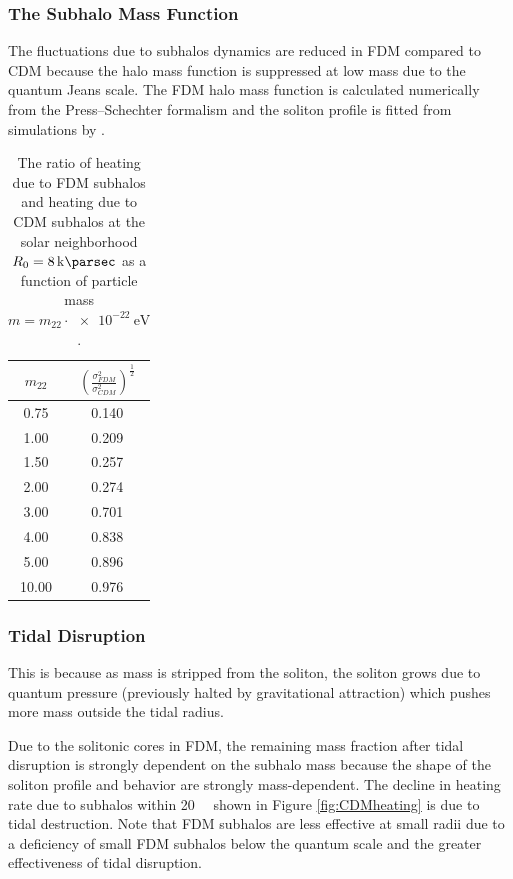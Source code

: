 \documentclass[usenatbib]{mnras}
\begin{document}
\subsubsection{The Subhalo Mass Function}

The fluctuations due to subhalos dynamics are reduced in FDM compared to CDM because the halo mass function is suppressed at low mass due to the quantum Jeans scale. The FDM halo mass function is calculated numerically from the Press--Schechter formalism \citep{substructure_FDM, marsh} and the soliton profile is fitted from simulations by \cite{schive_solitons}. 


\begin{table} 
\begin{center}
 \begin{tabular}{||c c||} 
 \hline
 $m_{22}$ & $\left( \frac{\sigma_{FDM}^2}{\sigma_{CDM}^2} \right)^{\tfrac{1}{2}}$ \\ [2.5ex] 
 \hline\hline
 0.75 & 0.140 \\ 
 \hline
 1.00 & 0.209 \\
 \hline
 1.50 & 0.257 \\
 \hline
 2.00 & 0.274 \\
 \hline
 3.00 & 0.701 \\
 \hline
 4.00 & 0.838 \\
 \hline
 5.00 & 0.896 \\
 \hline
 10.00 & 0.976 \\ [1ex] 
 \hline
\end{tabular}
\end{center}
\caption{The ratio of heating due to FDM subhalos and heating due to CDM subhalos at the solar neighborhood $R_0 = \SI{8}{\kilo\parsec}$ as a function of particle mass $m = m_{22} \cdot \SI{e-22}{\electronvolt}$. }
\label{table:FDM_ratio}
\end{table}


\subsubsection{Tidal Disruption}

 This is because as mass is stripped from the soliton, the soliton grows due to quantum pressure (previously halted by gravitational attraction) which pushes more mass outside the tidal radius. 
 
 Due to the solitonic cores in FDM, the remaining mass fraction after tidal disruption is strongly dependent on the subhalo mass because the shape of the soliton profile and behavior are strongly mass-dependent. The decline in heating rate due to subhalos within \SI{20}{\kilo\parsec} shown in Figure \ref{fig:CDMheating} is due to tidal destruction. Note that FDM subhalos are less effective at small radii due to a deficiency of small FDM subhalos below the quantum scale and the greater effectiveness of tidal disruption. 
\end{document}
